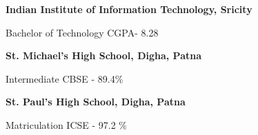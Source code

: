 \newcommand{\edu}[2]{%
  {\large\color{emphasis}\textbf{#1}\par}
  \smallskip\normalsize
  \ifstrequal{#2}{}{}{
  \color{accent}#2\par
  \smallskip}
  \normalsize
}




\edu{Indian Institute of Information Technology, Sricity}{Bachelor of Technology \hspace{6} CGPA- 8.28}
\medskip
\medskip
\edu{St. Michael's High School, Digha, Patna}{Intermediate \hspace{6} CBSE - 89.4\% }
\medskip
\medskip
\edu{St. Paul's High School, Digha, Patna}{Matriculation \hspace{6} ICSE - 97.2 \% }




